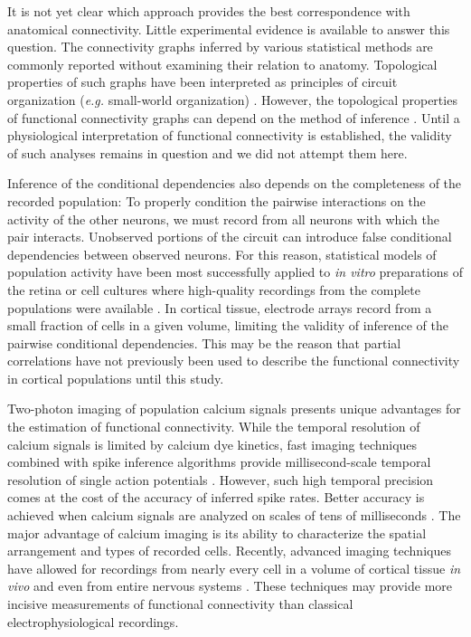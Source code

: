\documentclass[10pt]{article}
\begin{document}
It is not yet clear which approach provides the best correspondence with anatomical connectivity. Little experimental evidence is available to answer this question.  The connectivity graphs inferred by various statistical methods are commonly reported without examining their relation to anatomy.  
Topological properties of such graphs have been interpreted as principles of circuit organization (\emph{e.g.} small-world organization) \cite{Feldt:2011, Yu:2008, Malmersjo:2013}.  However, the topological properties of functional connectivity graphs can depend on the method of inference \cite{Zalesky:2012}. Until a physiological interpretation of functional connectivity is established, the validity of such analyses remains in question and we did not attempt them here.


Inference of the conditional dependencies also depends on the completeness of the recorded population:  To properly condition the pairwise interactions on the activity of the other neurons, we must record from all neurons with which the pair interacts. Unobserved portions of the circuit can introduce false conditional dependencies between observed neurons. For this reason, statistical models of population activity have been most successfully applied to \emph{in vitro} preparations of the retina or cell cultures where high-quality recordings from the complete populations were available \cite{Pillow:2008}. In cortical tissue, electrode arrays record from a small fraction of cells in a given volume, limiting the validity of inference of the pairwise conditional dependencies. This may be the reason that partial correlations have not previously been used to describe the functional connectivity in cortical populations until this study.


Two-photon imaging of population calcium signals presents unique advantages for the estimation of functional connectivity.  While the temporal resolution of calcium signals is limited by calcium dye kinetics, fast imaging techniques combined with spike inference algorithms provide millisecond-scale temporal resolution of single action potentials \cite{Grewe:2010}. However, such high temporal precision comes at the cost of the accuracy of inferred spike rates.  Better accuracy is achieved when calcium signals are analyzed on scales of tens of milliseconds \cite{Cotton:2013}.  The major advantage of calcium imaging is its ability to characterize the spatial arrangement and types of recorded cells.  Recently, advanced imaging techniques have allowed for recordings from nearly every cell in a volume of cortical tissue  \emph{in vivo} \cite{Katona:2012, Cotton:2013} and even from entire nervous systems \cite{Leung:2013, Ahrens:2013}.  These techniques may provide more incisive measurements of functional connectivity than classical electrophysiological recordings.  
\end{document}
